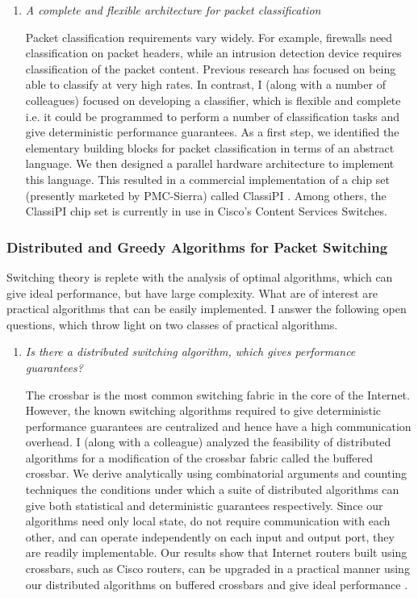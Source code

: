 \documentclass[10pt]{article}
\begin{document}
\begin{small}
\begin{enumerate}
\item {\em A complete and flexible architecture for packet classification}

Packet classification requirements vary widely.
For example, firewalls need classification on packet headers, while an
intrusion detection device requires classification of the packet content. 
Previous research has focused on being able to classify at very
high rates. In contrast, I (along with a number of colleagues) 
focused on developing a classifier, which is flexible and complete i.e. it could be programmed to
perform a number of classification tasks and give deterministic performance guarantees.
As a first step, we identified the elementary building blocks for packet
classification in terms of an abstract language. We then designed a parallel hardware architecture
to implement this 
language. This resulted in a commercial implementation of a chip set
(presently marketed by PMC-Sierra) called ClassiPI \cite{classipi}.
Among others, the ClassiPI chip set is currently in use in Cisco's
Content Services Switches.


\end{enumerate}

\subsubsection*{\small Distributed and Greedy Algorithms for Packet Switching}

Switching theory is replete with the analysis of optimal algorithms, which can give 
ideal performance, but have large complexity. What are of interest are practical algorithms that can 
be easily implemented. I answer the following open questions, which throw light on two classes of 
practical algorithms.

\begin{enumerate}
\item {\em Is there a distributed switching algorithm, which gives performance guarantees?}

The crossbar is the most common switching fabric in the core of the Internet. However,
the known switching algorithms required to give deterministic performance 
guarantees are centralized and hence have a high communication overhead.
I (along with a colleague) analyzed the feasibility of distributed algorithms for a
modification of the crossbar fabric called the buffered crossbar.
We derive analytically using combinatorial arguments and counting techniques the
conditions under which a suite of distributed algorithms can give 
both statistical and deterministic
guarantees respectively. 
Since our algorithms need only local state, do not require communication with each other, 
and can operate independently on each input and output port, they are readily implementable.
Our results show that Internet routers built using crossbars, such as Cisco routers, can 
be upgraded in a practical manner using our distributed 
algorithms on buffered crossbars and give ideal performance \cite{buffxbar}.


\end{enumerate}
\end{small}
\end{document}
